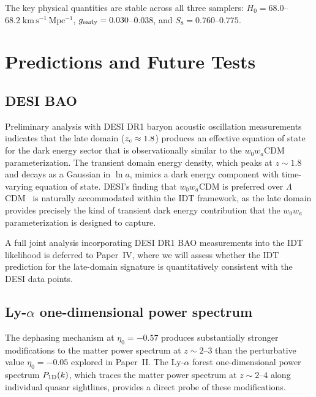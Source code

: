 \documentclass[aps,prd,twocolumn,superscriptaddress,nofootinbib]{revtex4-2}
\newcommand{\zc}{z_{\rm c}}
\newcommand{\Hubble}{H_0}
\newcommand{\gearly}{g_{\rm early}}
\newcommand{\etaz}{\eta_0}
\begin{document}
The key physical quantities are stable across all three samplers:
$\Hubble = 68.0$--$68.2\;\mathrm{km\,s^{-1}\,Mpc^{-1}}$,
$\gearly = 0.030$--$0.038$, and $S_8 = 0.760$--$0.775$.

\section{Predictions and Future Tests}
\label{sec:predictions}

\subsection{DESI BAO}
\label{sec:desi}

Preliminary analysis with DESI DR1 baryon acoustic oscillation
measurements~\cite{DESI2024} indicates that the late domain
($\zc \approx 1.8$) produces an effective equation of state for the
dark energy sector that is observationally similar to the
$w_0 w_a$CDM parameterization. The transient domain energy density,
which peaks at $z \sim 1.8$ and decays as a Gaussian in $\ln a$,
mimics a dark energy component with time-varying equation of state.
DESI's finding that $w_0 w_a$CDM is preferred over
$\Lambda$CDM~\cite{DESI2024} is naturally accommodated within the IDT
framework, as the late domain provides precisely the kind of transient
dark energy contribution that the $w_0 w_a$ parameterization is
designed to capture.

A full joint analysis incorporating DESI DR1 BAO measurements into
the IDT likelihood is deferred to Paper~IV, where we will assess
whether the IDT prediction for the late-domain signature is
quantitatively consistent with the DESI data points.

\subsection{Ly-$\alpha$ one-dimensional power spectrum}
\label{sec:lyalpha}

The dephasing mechanism at $\etaz = -0.57$ produces substantially
stronger modifications to the matter power spectrum at $z \sim 2$--$3$
than the perturbative value $\etaz = -0.05$ explored in Paper~II.
The Ly-$\alpha$ forest one-dimensional power spectrum $P_{\rm 1D}(k)$,
which traces the matter power spectrum at $z \sim 2$--$4$ along
individual quasar sightlines, provides a direct probe of these
modifications.
\end{document}
